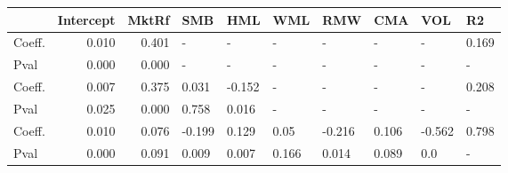 \begin{tabular}{lrrlllllll}
\toprule
{} &  Intercept &  MktRf &    SMB &    HML &    WML &    RMW &    CMA &    VOL &     R2 \\
\midrule
Coeff.  &      0.010 &  0.401 &      - &      - &      - &      - &      - &      - &  0.169 \\
Pval    &      0.000 &  0.000 &      - &      - &      - &      - &      - &      - &      - \\
Coeff.  &      0.007 &  0.375 &  0.031 & -0.152 &      - &      - &      - &      - &  0.208 \\
Pval    &      0.025 &  0.000 &  0.758 &  0.016 &      - &      - &      - &      - &      - \\
Coeff.  &      0.010 &  0.076 & -0.199 &  0.129 &   0.05 & -0.216 &  0.106 & -0.562 &  0.798 \\
Pval    &      0.000 &  0.091 &  0.009 &  0.007 &  0.166 &  0.014 &  0.089 &    0.0 &      - \\
\bottomrule
\end{tabular}
